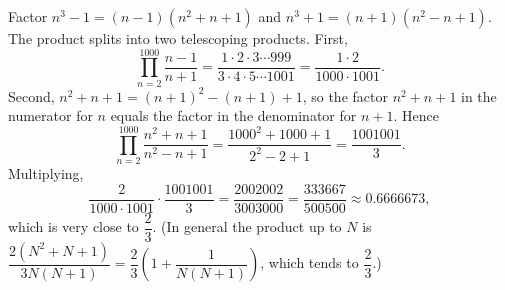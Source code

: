 Factor $n^3-1=(n-1)(n^2+n+1)$ and $n^3+1=(n+1)(n^2-n+1)$. The product splits into two telescoping products. First,
\[
\prod_{n=2}^{1000}\dfrac{n-1}{n+1}=\dfrac{1\cdot2\cdot3\cdots999}{3\cdot4\cdot5\cdots1001}=\dfrac{1\cdot2}{1000\cdot1001}.
\]
Second, $n^2+n+1=(n+1)^2-(n+1)+1$, so the factor $n^2+n+1$ in the numerator for $n$ equals the factor in the denominator for $n+1$. Hence
\[
\prod_{n=2}^{1000}\dfrac{n^2+n+1}{n^2-n+1}=\dfrac{1000^2+1000+1}{2^2-2+1}=\dfrac{1001001}{3}.
\]
Multiplying,
\[
\dfrac{2}{1000\cdot1001}\cdot\dfrac{1001001}{3}=\dfrac{2002002}{3003000}=\boxed{\dfrac{333667}{500500}}\approx0.6666673,
\]
which is very close to $\dfrac{2}{3}$. (In general the product up to $N$ is $\dfrac{2(N^2+N+1)}{3N(N+1)}=\dfrac{2}{3}\left(1+\dfrac{1}{N(N+1)}\right)$, which tends to $\dfrac{2}{3}$.)
